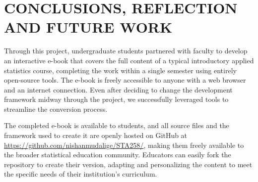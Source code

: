 \documentclass[11pt]{article}
\begin{document}




\section{CONCLUSIONS, REFLECTION AND FUTURE WORK}

Through this project, undergraduate students partnered with faculty to develop an interactive e-book that covers the full content of a typical introductory applied statistics course, completing the work within a single semester using entirely open-source tools. The e-book is freely accessible to anyone with a web browser and an internet connection. Even after deciding to change the development framework midway through the project, we successfully leveraged tools to streamline the conversion process.

The completed e-book is available to students, and all source files and the framework used to create it are openly hosted on GitHub at \href{https://github.com/nishanmudalige/STA258/}{https://github.com/nishanmudalige/STA258/}, making them freely available to the broader statistical education community. Educators can easily fork the repository to create their version, adapting and personalizing the content to meet the specific needs of their institution’s curriculum.
\end{document}
